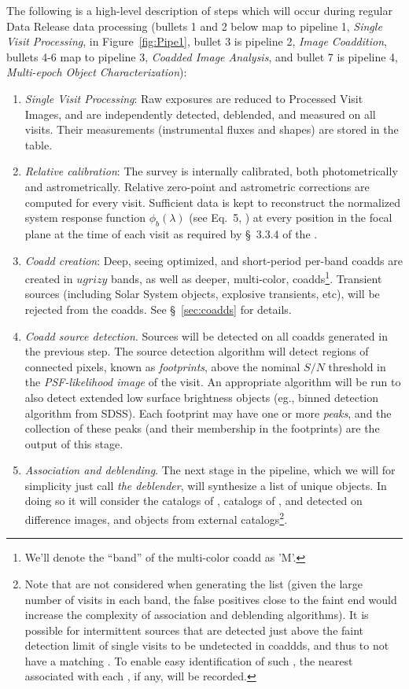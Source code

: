 \documentclass[SE,lsstdraft,toc]{lsstdoc}
\begin{document}
The following is a high-level description of steps which will occur during regular Data Release data processing
(bullets 1 and 2 below map to pipeline 1, \emph{Single Visit Processing}, in Figure~\ref{fig:Pipe1}, bullet 3 is
pipeline 2, \emph{Image Coaddition}, bullets 4-6 map to pipeline 3, \emph{Coadded Image Analysis}, and
bullet 7 is pipeline 4, \emph{Multi-epoch Object Characterization}):
\begin{enumerate}
    \item \emph{Single Visit Processing}: Raw exposures are reduced to Processed Visit Images, and \Sources are independently detected, deblended, and measured on all visits. Their measurements (instrumental fluxes and shapes) are stored in the \Source table.
    \item \emph{Relative calibration}: The survey is internally calibrated, both photometrically and astrometrically. Relative zero-point and astrometric corrections are computed for every visit.  Sufficient data is kept to reconstruct the normalized system response function $\phi_b(\lambda)$ (see Eq.~5, \SRD) at every position in the focal plane at the time of each visit as required by \S~3.3.4 of the \SRD.
    \item \emph{Coadd creation}: Deep, seeing optimized,  and short-period per-band coadds are created in $ugrizy$ bands, as well as deeper, multi-color,  coadds\footnote{We'll denote the ``band'' of the multi-color coadd as 'M'.}. Transient sources (including Solar System objects, explosive transients, etc), will be rejected from the coadds. See \S~\ref{sec:coadds} for details.
    \item \emph{Coadd source detection}. Sources will be detected on all coadds generated in the previous step. The source detection algorithm will detect regions of connected pixels, known as \emph{footprints}, above the nominal $S/N$ threshold in the \emph{PSF-likelihood image} of the visit. An appropriate algorithm will be run to also detect extended low surface brightness objects
(eg., binned detection algorithm from SDSS).  Each footprint may have one or more \emph{peaks}, and the collection of these peaks (and their membership in the footprints) are the output of this stage.
    \item \emph{Association and deblending}.  The next stage in the pipeline, which we will for simplicity just call \emph{the deblender}, will synthesize a list of unique objects. In doing so it will consider the catalogs of \CoaddSources, catalogs of \DIASources, \DIAObjects and \SSObjects detected on difference images, and objects from external
catalogs\footnote{Note that \Sources are not considered when generating the \Object list (given the large
number of visits in each band, the false positives close to the faint end would increase the complexity of
association and deblending algorithms). It is possible for intermittent sources that are detected just above
the faint detection limit of single visits to be undetected in coaddds, and thus to not have a matching \Object.
To enable easy identification of such \Sources, the nearest \Object associated with each \Source, if any, will be recorded.}.


\end{enumerate}
\end{document}
